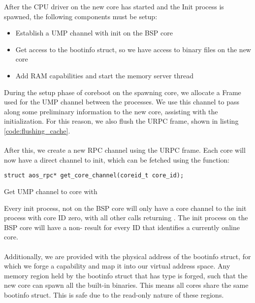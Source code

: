After the CPU driver on the new core has started and the Init process is spawned, the following components must be setup:
\begin{itemize}
    \item Establish a UMP channel with init on the BSP core
    \item Get access to the bootinfo struct, so we have access to binary files on the new core
    \item Add RAM capabilities and start the memory server thread
\end{itemize}
During the setup phase of coreboot on the spawning core, we allocate a Frame used for the UMP channel between the processes. We use this channel to pass along some preliminary information to the new core, assisting with the initialization. For this reason, we also flush the URPC frame, shown in listing \ref{code:flushing_cache}. 
\paragraph{}
After this, we create a new RPC channel using the URPC frame. Each core will now have a direct channel to init, which can be fetched using the function:
\begin{code}

\begin{mdframed}[style=myframe]
\begin{verbatim}
struct aos_rpc* get_core_channel(coreid_t core_id);
\end{verbatim}
\end{mdframed}
\caption{Get UMP channel to core with }
\label{code:get_core_channel}
\newline
\end{code}

Every init process, not on the BSP core will only have a core channel to the init process with core ID zero, with all other  calls returning . The init process on the BSP core will have a non- result for every ID that identifies a currently online core. 

\paragraph{}
Additionally, we are provided with the physical address of the bootinfo struct, for which we forge a capability and map it into our virtual address space. Any memory region held by the bootinfo struct that has type  is forged, such that the new core can spawn all the built-in binaries. This means all cores share the same bootinfo struct. This is safe due to the read-only nature of these regions.



